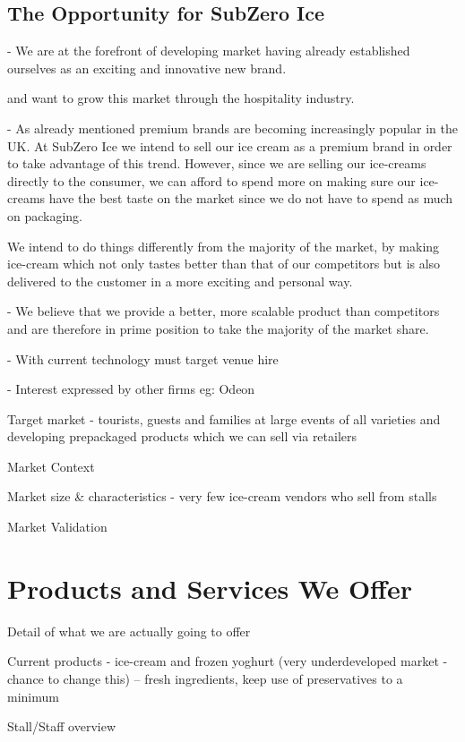 \documentclass{article}
\begin{document}
  \subsection{The Opportunity for SubZero Ice}

   - We are at the forefront of developing market having already established ourselves as an exciting and innovative new brand.

    and want to grow this market through the hospitality industry.


  - As already mentioned premium brands are becoming increasingly popular in the UK. At SubZero Ice we intend to sell our ice cream as a premium brand in order to take advantage of this trend. However, since we are selling our ice-creams directly to the consumer, we can afford to spend more on making sure our ice-creams have the best taste on the market since we do not have to spend as much on packaging.

  We intend to do things differently from the majority of the market, by making ice-cream which not only tastes better than that of our competitors but is also delivered to the customer in a more exciting and personal way.

 - We believe that we provide a better, more scalable product than competitors and are therefore in prime position to take the majority of the market share.

   - With current technology must target venue hire

   - Interest expressed by other firms eg: Odeon

  Target market - tourists, guests and families at large events of all varieties and developing prepackaged products which we can sell via retailers

  Market Context

  Market size \& characteristics - very few ice-cream vendors who sell from stalls

  Market Validation


\section{Products and Services We Offer}
  Detail of what we are actually going to offer

  Current products - ice-cream and frozen yoghurt (very underdeveloped market - chance to change this)
    -- fresh ingredients, keep use of preservatives to a minimum

  Stall/Staff overview
\end{document}
